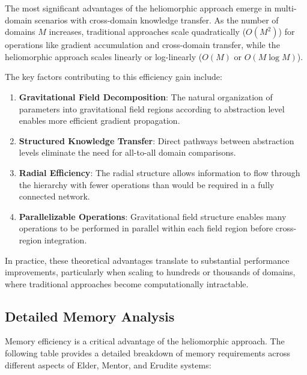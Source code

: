 \begin{definition}
\begin{theorem}
The most significant advantages of the heliomorphic approach emerge in multi-domain scenarios with cross-domain knowledge transfer. As the number of domains $M$ increases, traditional approaches scale quadratically ($O(M^2)$) for operations like gradient accumulation and cross-domain transfer, while the heliomorphic approach scales linearly or log-linearly ($O(M)$ or $O(M \log M)$).

The key factors contributing to this efficiency gain include:

\begin{enumerate}
    \item \textbf{Gravitational Field Decomposition}: The natural organization of parameters into gravitational field regions according to abstraction level enables more efficient gradient propagation.
    
    \item \textbf{Structured Knowledge Transfer}: Direct pathways between abstraction levels eliminate the need for all-to-all domain comparisons.
    
    \item \textbf{Radial Efficiency}: The radial structure allows information to flow through the hierarchy with fewer operations than would be required in a fully connected network.
    
    \item \textbf{Parallelizable Operations}: Gravitational field structure enables many operations to be performed in parallel within each field region before cross-region integration.
\end{enumerate}

In practice, these theoretical advantages translate to substantial performance improvements, particularly when scaling to hundreds or thousands of domains, where traditional approaches become computationally intractable.

\subsection{Detailed Memory Analysis}

Memory efficiency is a critical advantage of the heliomorphic approach. The following table provides a detailed breakdown of memory requirements across different aspects of Elder, Mentor, and Erudite systems:


\end{theorem}
\end{definition}
